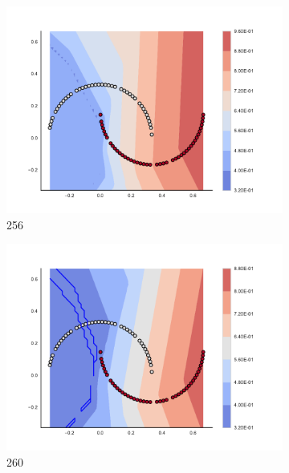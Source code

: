 \begin{figure}[h]
\begin{subfigure}[b]{0.09\textwidth}
    \includegraphics[clip, trim=2.35cm 1.75cm 4.5cm 0cm,width=\textwidth]{img/convergence/256.pdf}
    \caption{256}
    \label{fig:convergence_256}
\end{subfigure}
%
\begin{subfigure}[b]{0.09\textwidth}
    \includegraphics[clip, trim=2.35cm 1.75cm 4.5cm 0cm,width=\textwidth]{img/convergence/260.pdf}
    \caption{260}
    \label{fig:convergence_260}
\end{subfigure}
%
\begin{subfigure}[b]{0.09\textwidth}

\end{subfigure}
\end{figure}
